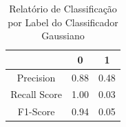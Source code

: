 \documentclass{beamer}
\begin{document}
\begin{frame}
\begin{columns}
\begin{column}{0.5\textwidth}
\begin{table}[H]
\begin{small}
\begin{tabular}{ccc}
                            \hline
                        \end{tabular}
                    \end{small}
                \end{table}
            \end{column}
            \begin{column}{0.5\textwidth}
                \begin{table}[H]

                    \centering
                    \caption{\label{tab:cr2-gnb} Relatório de Classificação por Label do Classificador Gaussiano}
                    \begin{small}
                        \begin{tabular}{ccc}
                        
                            \hline
                                                    & 0                & 1\\
                            \hline
                            Precision               & 0.88             & 0.48\\
                            Recall Score            & 1.00             & 0.03\\
                            F1-Score                & 0.94             & 0.05\\
                            
                            \hline
                        \end{tabular}
                    \end{small}
                
                \end{table}
            \end{column}
            \end{columns}    
    \end{frame}
    
\end{document}

